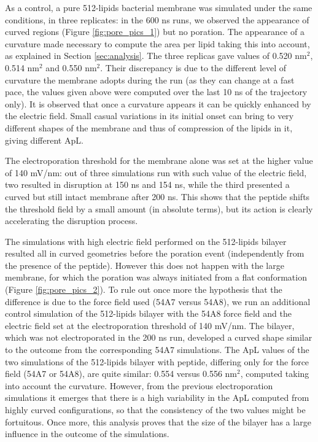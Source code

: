 As a control, a pure 512-lipids bacterial membrane was simulated under the same conditions, in three replicates: in the 600 ns runs, we observed the appearance of curved regions (Figure \ref{fig:pore_pics_1}) but no poration.
%
The appearance of a curvature made necessary to compute the area per lipid taking this into account, as explained in Section \ref{sec:analysis}. The three replicas gave values of 0.520 nm$^2$, 0.514 nm$^2$ and 0.550 nm$^2$. Their discrepancy is due to the different level of curvature the membrane adopts during the run (as they can change at a fast pace, the values given above were computed over the last 10 ns of the trajectory only).
%
It is observed that once a curvature appears it can be quickly enhanced by the electric field. Small casual variations in its initial onset can bring to very different shapes of the membrane and thus of compression of the lipids in it, giving different ApL.

The electroporation threshold for the membrane alone was set at the higher value of 140 mV/nm: out of three simulations run with such value of the electric field, two resulted in disruption at 150 ns and 154 ns, while the third presented a curved but still intact membrane after 200 ns.
%
This shows that the peptide shifts the threshold field by a small amount (in absolute terms), but its action is clearly accelerating the disruption process.

The simulations with high electric field performed on the 512-lipids bilayer resulted all in curved geometries before the poration event (independently from the presence of the peptide). However this does not happen with the large membrane, for which the poration was always initiated from a flat conformation (Figure \ref{fig:pore_pics_2}).
%
To rule out once more the hypothesis that the difference is due to the force field used (54A7 versus 54A8), we run an additional control simulation of the 512-lipids bilayer with the 54A8 force field and the electric field set at the electroporation threshold of 140 mV/nm. The bilayer, which was not electroporated in the 200 ns run, developed a curved shape similar to the outcome from the corresponding 54A7 simulations.
%
The ApL values of the two simulations of the 512-lipids bilayer with peptide, differing only for the force field (54A7 or 54A8), are quite similar: 0.554 versus 0.556 nm$^2$, computed taking into account the curvature.
%
However, from the previous electroporation simulations it emerges that there is a high variability in the ApL computed from highly curved configurations, so that the consistency of the two values might be fortuitous.
%
Once more, this analysis proves that the size of the bilayer has a large influence in the outcome of the simulations.

